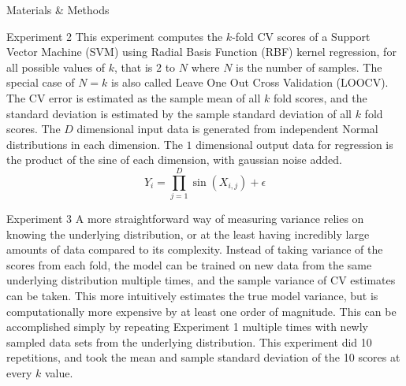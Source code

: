 \documentclass[onecolumn,abstract,paper=letter]{scrartcl}
\begin{document}
\begin{section}{Materials \& Methods}
\begin{subsection}{Experiment 2}
This experiment computes the $k$-fold CV scores of a Support Vector Machine (SVM) using Radial Basis Function (RBF) kernel regression, for all possible values of $k$, that is $2$ to $N$ where $N$ is the number of samples.
The special case of $N=k$ is also called Leave One Out Cross Validation (LOOCV).
The CV error is estimated as the sample mean of all $k$ fold scores, and the standard deviation is estimated by the sample standard deviation of all $k$ fold scores.
The $D$ dimensional input data is generated from independent Normal distributions in each dimension.
The $1$ dimensional output data for regression is the product of the sine of each dimension, with gaussian noise added.
\begin{equation}
    Y_i = \prod_{j=1}^{D} \sin(X_{i,j}) + \epsilon
\end{equation}
\end{subsection}


\begin{subsection}{Experiment 3}
A more straightforward way of measuring variance relies on knowing the underlying distribution, or at the least having incredibly large amounts of data compared to its complexity. 
Instead of taking variance of the scores from each fold, the model can be trained on new data from the same underlying distribution multiple times, and the sample variance of CV estimates can be taken.
This more intuitively estimates the true model variance, but is computationally more expensive by at least one order of magnitude. 
This can be accomplished simply by repeating Experiment 1 multiple times with newly sampled data sets from the underlying distribution. 
This experiment did 10 repetitions, and took the mean and sample standard deviation of the 10 scores at every $k$ value.

\end{subsection}




\end{section}
\end{document}
